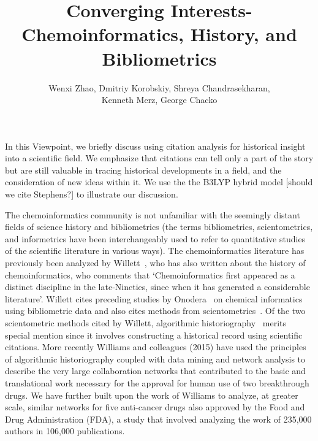 \documentclass[11pt, oneside]{article}   	%
\title{Converging Interests- Chemoinformatics, History, and Bibliometrics}
\author{Wenxi Zhao, Dmitriy Korobskiy, Shreya Chandrasekharan, \\Kenneth Merz, George Chacko}
\begin{document}
\maketitle

In this Viewpoint, we briefly discuss using citation analysis for historical insight into a scientific field. We emphasize that citations can tell only a part of the story but are still valuable in tracing historical developments in a field, and the consideration of new ideas within it. We use the the B3LYP hybrid model [should we cite Stephens?] to illustrate our discussion. 

The chemoinformatics community is not unfamiliar with the seemingly distant fields of science history and bibliometrics (the terms bibliometrics, scientometrics, and informetrics have been interchangeably used to refer to quantitative studies of the scientific literature in various ways\citep{debellis2009}). The chemoinformatics literature has previously been analyzed by Willett~\citep{willett2008}, who has also written about the history of chemoinformatics\citep{willett2003}, who comments that  `Chemoinformatics first appeared as a distinct discipline in the late-Nineties, since when it has generated a considerable literature'. Willett cites preceding studies by Onodera~\citep{onodera2001,onodera2003} on chemical informatics using bibliometric data and also cites methods from scientometrics~\citep{garfield2004,leydesdorff2007}.  Of the two scientometric methods cited by Willett, algorithmic historiography~\citep{garfield2004} merits special mention since it involves constructing a historical record using scientific citations. More recently Williams and colleagues (2015)\citep{williams2015scientific} have used the principles of algorithmic historiography coupled with data mining and network analysis to describe the very large collaboration networks that contributed to the basic and translational work necessary for the approval for human use of two breakthrough drugs. We\citep{keserci2017research} have further built upon the work of Williams to analyze, at greater scale, similar networks for five anti-cancer drugs also approved by the Food and Drug Administration (FDA), a study that involved analyzing the work of 235,000 authors in 106,000 publications.
\end{document}

